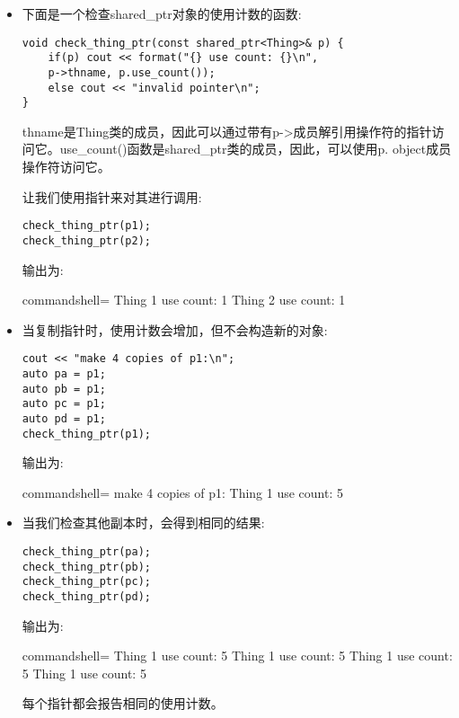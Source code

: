\begin{itemize}
\item 
下面是一个检查shared\_ptr对象的使用计数的函数:

\begin{lstlisting}[style=styleCXX]
void check_thing_ptr(const shared_ptr<Thing>& p) {
	if(p) cout << format("{} use count: {}\n",
	p->thname, p.use_count());
	else cout << "invalid pointer\n";
}
\end{lstlisting}

thname是Thing类的成员，因此可以通过带有p->成员解引用操作符的指针访问它。use\_count()函数是shared\_ptr类的成员，因此，可以使用p. object成员操作符访问它。

让我们使用指针来对其进行调用:

\begin{lstlisting}[style=styleCXX]
check_thing_ptr(p1);
check_thing_ptr(p2);
\end{lstlisting}

输出为:

\begin{tcblisting}{commandshell={}}
Thing 1 use count: 1
Thing 2 use count: 1
\end{tcblisting}


\item 
当复制指针时，使用计数会增加，但不会构造新的对象:

\begin{lstlisting}[style=styleCXX]
cout << "make 4 copies of p1:\n";
auto pa = p1;
auto pb = p1;
auto pc = p1;
auto pd = p1;
check_thing_ptr(p1);
\end{lstlisting}

输出为:

\begin{tcblisting}{commandshell={}}
make 4 copies of p1:
Thing 1 use count: 5
\end{tcblisting}

\item 
当我们检查其他副本时，会得到相同的结果:

\begin{lstlisting}[style=styleCXX]
check_thing_ptr(pa);
check_thing_ptr(pb);
check_thing_ptr(pc);
check_thing_ptr(pd);
\end{lstlisting}

输出为:

\begin{tcblisting}{commandshell={}}
Thing 1 use count: 5
Thing 1 use count: 5
Thing 1 use count: 5
Thing 1 use count: 5
\end{tcblisting}

每个指针都会报告相同的使用计数。


\end{itemize}
